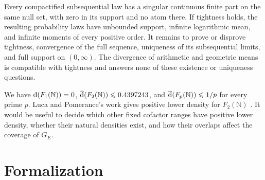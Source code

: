 \documentclass[11pt,letterpaper,reqno]{amsart}
\numberwithin{equation}{section}
\theoremstyle{remark}
\newcommand{\N}{\mathbb{N}}
\newcommand{\1}{\mathbf 1}
\newcommand{\upperdens}{\overline{\textup{d}}}
\renewcommand{\leq}{\leqslant}
\begin{document}
Every compactified subsequential law has a singular continuous finite
part on the same null set, with zero in its support and no atom there.
If tightness holds, the resulting probability laws have unbounded support,
infinite logarithmic mean, and infinite moments of every positive order.
It remains to prove or disprove tightness, convergence of the full sequence,
uniqueness of its subsequential limits, and full support on $(0,\infty)$.
The divergence of arithmetic and geometric means is compatible with
tightness and answers none of these existence or uniqueness questions.

We have $\textup{d}(F_1(\N))=0$, $\upperdens(F_2(\N))\leq0.4397243$, and
$\upperdens(F_p(\N))\leq1/p$ for every prime $p$.
Luca and Pomerance's work gives positive lower density for $F_2(\N)$
\cite{LucaPomerance}. It would be useful to decide which other fixed
cofactor ranges have positive lower density, whether their natural
densities exist, and how their overlaps affect the coverage of $G_E$.





\section*{Formalization}
\end{document}
